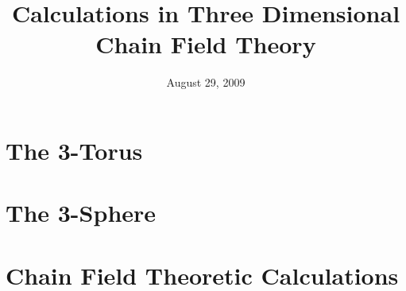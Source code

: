 \documentclass[10pt,oneside]{article}
\title{Calculations in Three Dimensional Chain Field Theory}
\date{August 29, 2009}
\begin{document}
\maketitle

\section{The 3-Torus}

\section{The 3-Sphere}


\section{Chain Field Theoretic Calculations}


\nocite{*}


\end{document}
